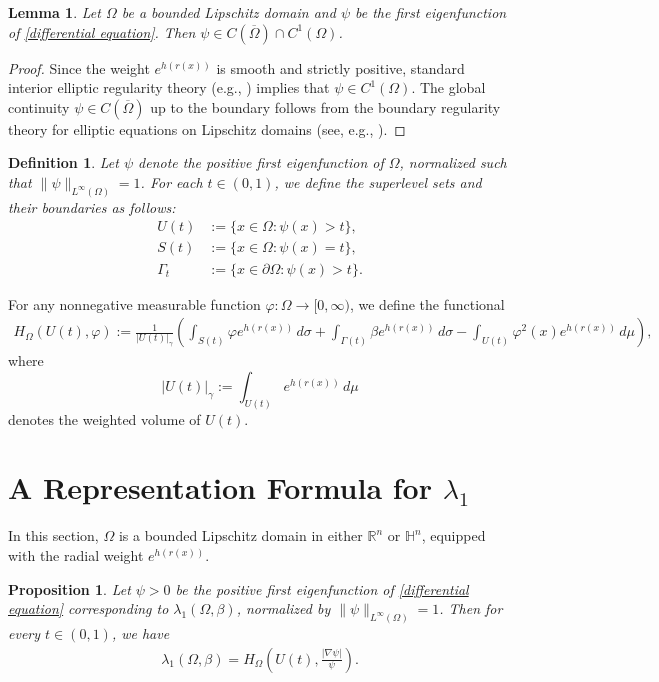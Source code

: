 \documentclass[11pt,leqno]{amsart}
\newtheorem{lemma}{Lemma}[section]
\newtheorem{prop}{Proposition}[section]
\newtheorem{definition}[theorem]{Definition}
\numberwithin{equation}{section}
\begin{document}
\begin{lemma}\label{lem:regularity}
    Let $\Omega$ be a bounded Lipschitz domain and $\psi$ be the first eigenfunction of \eqref{differential equation}. Then $\psi \in C(\overline{\Omega}) \cap C^1(\Omega)$.
\end{lemma}
\begin{proof}
    Since the weight $e^{h(r(x))}$ is smooth and strictly positive, standard interior elliptic regularity theory (e.g., \cite[Theorem 8.10]{Trudinger}) implies that $\psi \in C^1(\Omega)$. The global continuity $\psi \in C(\overline{\Omega})$ up to the boundary follows from the boundary regularity theory for elliptic equations on Lipschitz domains (see, e.g., \cite[pp. 466--467]{Ladyzhenskaya}).
\end{proof}
\begin{definition}\label{def:level_sets}
Let $\psi$ denote the positive first eigenfunction of $\Omega$, normalized such that $\|\psi\|_{L^\infty(\Omega)} = 1$. For each $t \in (0,1)$, we define the superlevel sets and their boundaries as follows:
\begin{align*}
U(t) &:= \{x \in \Omega : \psi(x) > t\}, \\
S(t) &:= \{x \in \Omega : \psi(x) = t\}, \\
\Gamma_{t} &:= \{x \in \partial\Omega : \psi(x) > t\}.
\end{align*}
\end{definition}
For any nonnegative measurable function $\varphi \colon \Omega \to [0,\infty)$, we define the functional
\begin{align}\label{eq:H_Omega}
H_{\Omega}(U(t),\varphi) := \frac{1}{|U(t)|_\gamma} \left( \int_{S(t)} \varphi e^{h(r(x))} \, d\sigma
+ \int_{\Gamma(t)} \beta e^{h(r(x))} \, d\sigma
- \int_{U(t)} \varphi^2(x) e^{h(r(x))} \, d\mu \right),
\end{align}
where 
$$
|U(t)|_{\gamma} := \int_{U(t)} e^{h(r(x))} \, d\mu
$$
denotes the weighted volume of $U(t)$.

\section{A Representation Formula for $\lambda_{1}$}\label{sect3}
In this section,  $\Omega$ is a bounded Lipschitz domain in  either $\mathbb{R}^n$ or $\mathbb{H}^n$, equipped with the radial weight $e^{h(r(x))}$.

\begin{prop}\label{lambda representation 3.1}
    Let $\psi>0$ be the positive first eigenfunction of \eqref{differential equation} corresponding to $\lambda_{1}(\Omega,\beta)$, normalized by $\|\psi\|_{L^\infty(\Omega)} = 1$. Then for every $t\in (0,1)$, we have
    \begin{align}\label{eq:lambda_rep}
        \lambda_{1}(\Omega,\beta) = H_{\Omega}\!\left(U(t), \frac{|\nabla \psi|}{\psi}\right).
    \end{align}
\end{prop}
\end{document}
